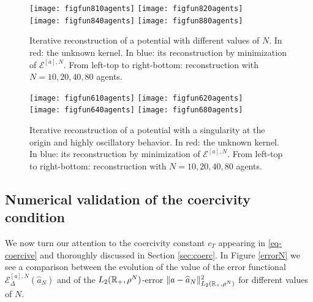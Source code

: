\begin{figure}[h!]
\begin{center}
\hspace{-0.7cm}\texttt{[image: figfun810agents]}\hspace{-0.9cm}
\texttt{[image: figfun820agents]}\\
\hspace{-0.7cm}\texttt{[image: figfun840agents]}\hspace{-0.9cm}
\texttt{[image: figfun880agents]}
\end{center}
\caption{Iterative reconstruction of a potential with different values of $N$. In red: the unknown kernel. In blue: its reconstruction by minimization of $\mathcal{E}^{[a],N}$. From left-top to right-bottom: reconstruction with $N = 10, 20, 40, 80$ agents.}\label{variableN}
\end{figure}

\begin{figure}[h!]
\begin{center}
\hspace{-0.7cm}\texttt{[image: figfun610agents]}\hspace{-0.9cm}
\texttt{[image: figfun620agents]}\\
\hspace{-0.7cm}\texttt{[image: figfun640agents]}\hspace{-0.9cm}
\texttt{[image: figfun680agents]}
\end{center}
\caption{Iterative reconstruction of a potential with a singularity at the origin and highly oscillatory behavior. In red: the unknown kernel. In blue: its reconstruction by minimization of $\mathcal{E}^{[a],N}$. From left-top to right-bottom: reconstruction with $N = 10, 20, 40, 80$ agents.}\label{variableN2}
\end{figure}

\subsection{Numerical validation of the coercivity condition}\label{numcoer}

We now turn our attention to the coercivity constant $c_T$ appearing in \eqref{eq-coercive} and thoroughly discussed in Section \ref{sec:coerc}. In Figure \ref{errorN} we see a comparison between the evolution of the value of the error functional $\mathcal{E}^{[a],N}_\Delta(\widehat{a}_N)$ and of the $L_2(\mathbb{R}_+,\rho^N)$-error $\|a-\widehat{a}_N\|^2_{L_2(\mathbb{R}_+,\rho^N)}$ for different values of $N$. 

